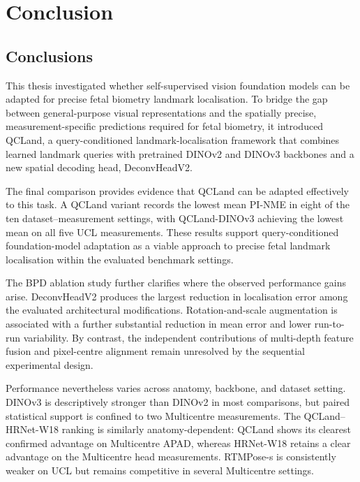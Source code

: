 \chapter{Conclusion}
\label{chap:conclusion}



\section{Conclusions}
\label{sec:conclusion-summary}

This thesis investigated whether self-supervised vision foundation
models can be adapted for precise fetal biometry landmark
localisation. To bridge the gap between general-purpose visual
representations and the spatially precise, measurement-specific
predictions required for fetal biometry, it introduced QCLand, a
query-conditioned landmark-localisation framework that combines
learned landmark queries with pretrained DINOv2 and DINOv3 backbones
and a new spatial decoding head, DeconvHeadV2.

The final comparison provides evidence that QCLand can be adapted
effectively to this task. A QCLand variant records the lowest mean
PI-NME in eight of the ten dataset--measurement settings, with
QCLand-DINOv3 achieving the lowest mean on all five UCL
measurements. These results support query-conditioned
foundation-model adaptation as a viable approach to precise fetal
landmark localisation within the evaluated benchmark settings.

The BPD ablation study further clarifies where the observed
performance gains arise. DeconvHeadV2 produces the largest reduction
in localisation error among the evaluated architectural
modifications. Rotation-and-scale augmentation is associated with a
further substantial reduction in mean error and lower run-to-run
variability. By contrast, the independent contributions of
multi-depth feature fusion and pixel-centre alignment remain
unresolved by the sequential experimental design.

Performance nevertheless varies across anatomy, backbone, and dataset
setting. DINOv3 is descriptively stronger than DINOv2 in most
comparisons, but paired statistical support is confined to two
Multicentre measurements. The QCLand--HRNet-W18 ranking is similarly
anatomy-dependent: QCLand shows its clearest confirmed advantage on
Multicentre APAD, whereas HRNet-W18 retains a clear advantage on the
Multicentre head measurements. RTMPose-s is consistently weaker on
UCL but remains competitive in several Multicentre settings.

